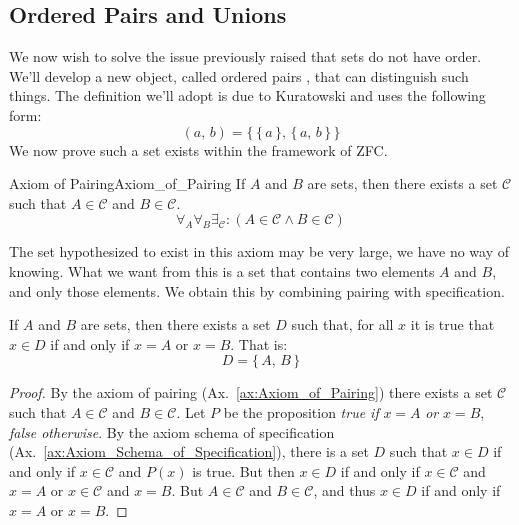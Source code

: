     \subsection{Ordered Pairs and Unions}
        We now wish to solve the issue previously raised that sets do
        not have order. We'll develop a new object, called ordered pairs%
        , that can distinguish such things. The definition
        we'll adopt is due to Kuratowski and uses
        the following form:
        \begin{equation}
            (a,\,b)=\Big\{\,\big\{\,a\,\big\},\,\big\{\,a,\,b\,\big\}\,\Big\}
        \end{equation}
        We now prove such a set exists within the framework of ZFC.
        \begin{faxiom}{Axiom of Pairing}{Axiom_of_Pairing}
            If $A$ and $B$ are sets, then there exists a set $\mathcal{C}$
            such that $A\in\mathcal{C}$ and $B\in\mathcal{C}$.
            \begin{equation*}
                \forall_{A}\forall_{B}\exists_{\mathcal{C}}:
                (A\in\mathcal{C}\land{B}\in\mathcal{C})
            \end{equation*}
        \end{faxiom}
        The set hypothesized to exist in this axiom may be very large, we have
        no way of knowing. What we want from this is a set that contains two
        elements $A$ and $B$, and only those elements. We obtain this by
        combining pairing with specification.
        \begin{theorem}
            \label{thm:Existence_of_Set_Built_from_Two_Sets}%
            If $A$ and $B$ are sets, then there exists a set $D$ such that,
            for all $x$ it is true that $x\in{D}$ if and only if $x=A$ or
            $x=B$. That is:
            \begin{equation}
                D=\{\,A,\,B\,\}
            \end{equation}
        \end{theorem}
        \begin{proof}
            By the axiom of pairing (Ax.~\ref{ax:Axiom_of_Pairing}) there
            exists a set $\mathcal{C}$ such that $A\in\mathcal{C}$ and
            $B\in\mathcal{C}$. Let $P$ be the proposition
            \textit{true if} $x=A$ \textit{or} $x=B$, \textit{false otherwise}.
            By the axiom schema of specification
            (Ax.~\ref{ax:Axiom_Schema_of_Specification}), there is a set
            $D$ such that $x\in{D}$ if and only if $x\in\mathcal{C}$ and
            $P(x)$ is true. But then $x\in{D}$ if and only if
            $x\in\mathcal{C}$ and $x=A$ or $x\in\mathcal{C}$ and $x=B$.
            But $A\in\mathcal{C}$ and $B\in\mathcal{C}$, and thus
            $x\in{D}$ if and only if $x=A$ or $x=B$.
        \end{proof}
